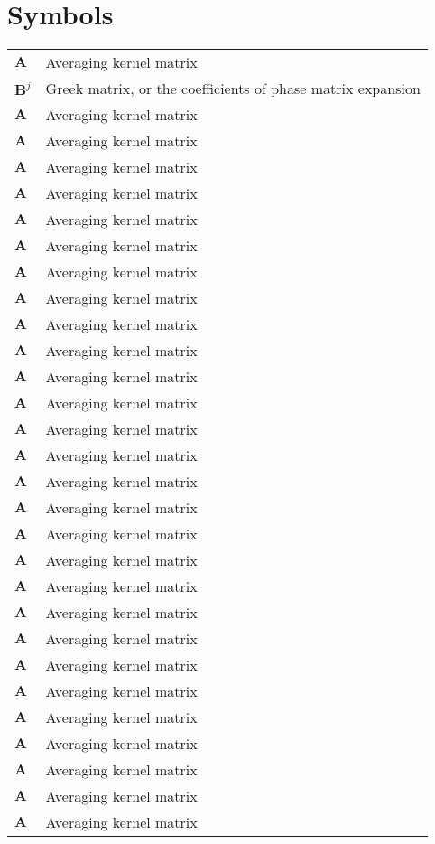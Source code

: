 \chapter{Symbols}

\begin{center}
\begin{small}
\begin{longtable}{p{5em} p{30em} }
  $\mathbf{A}$     & Averaging kernel matrix \\
  $\mathbf{B}^j$   & Greek matrix, or the coefficients of phase matrix
expansion \\
  $\mathbf{A}$     & Averaging kernel matrix \\
  $\mathbf{A}$     & Averaging kernel matrix \\
  $\mathbf{A}$     & Averaging kernel matrix \\
  $\mathbf{A}$     & Averaging kernel matrix \\
  $\mathbf{A}$     & Averaging kernel matrix \\
  $\mathbf{A}$     & Averaging kernel matrix \\
  $\mathbf{A}$     & Averaging kernel matrix \\
  $\mathbf{A}$     & Averaging kernel matrix \\
  $\mathbf{A}$     & Averaging kernel matrix \\
  $\mathbf{A}$     & Averaging kernel matrix \\
  $\mathbf{A}$     & Averaging kernel matrix \\
  $\mathbf{A}$     & Averaging kernel matrix \\
  $\mathbf{A}$     & Averaging kernel matrix \\
  $\mathbf{A}$     & Averaging kernel matrix \\
  $\mathbf{A}$     & Averaging kernel matrix \\
  $\mathbf{A}$     & Averaging kernel matrix \\
  $\mathbf{A}$     & Averaging kernel matrix \\
  $\mathbf{A}$     & Averaging kernel matrix \\
  $\mathbf{A}$     & Averaging kernel matrix \\
  $\mathbf{A}$     & Averaging kernel matrix \\
  $\mathbf{A}$     & Averaging kernel matrix \\
  $\mathbf{A}$     & Averaging kernel matrix \\
  $\mathbf{A}$     & Averaging kernel matrix \\
  $\mathbf{A}$     & Averaging kernel matrix \\
  $\mathbf{A}$     & Averaging kernel matrix \\
  $\mathbf{A}$     & Averaging kernel matrix \\
  $\mathbf{A}$     & Averaging kernel matrix \\
  $\mathbf{A}$     & Averaging kernel matrix \\
\end{longtable}
\end{small}
\end{center}
